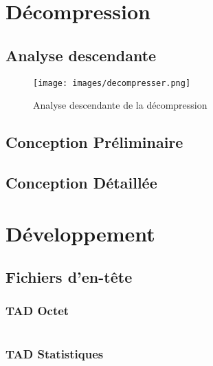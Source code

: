 \documentclass[10pt]{report}
\begin{document}
    \chapter{Décompression}

        \section{Analyse descendante}
		\begin{figure}
   			\centering     
    		\texttt{[image: images/decompresser.png]}
    		\caption{Analyse descendante de la décompression}
    		\label{fig:exemple}
		\end{figure}
        \newpage
        \section{Conception Préliminaire}
        	
        	
        	
        	

        \newpage
        \section{Conception Détaillée}
        	
        	
        	
        	
        	
        	

    \chapter{Développement}

        \section{Fichiers d'en-tête}
            \subsection{TAD Octet}
                \inputminted[breaklines]{c}{../include/octet.h}
            \subsection{TAD Statistiques}
                \inputminted[breaklines]{c}{../include/statistiques.h}
\end{document}
